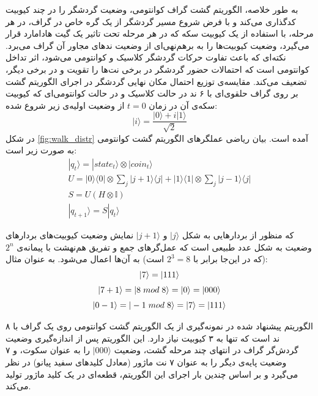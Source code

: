 به طور خلاصه، الگوریتم گشت گراف کوانتومی، وضعیت گردشگر را در چند کیوبیت کدگذاری می‌کند و با فرض شروع مسیر گردشگر از یک گره خاص در گراف، در هر مرحله، با استفاده از یک کیوبیت سکه
که در هر مرحله تحت تاثیر یک گیت هادامارد قرار می‌گیرد، وضعیت کیوبیت‌ها را به برهم‌نهی‌ای از وضعیت ندهای مجاور آن گراف می‌برد. نکته‌ای که باعث تفاوت حرکات گردشگر کلاسیک و کوانتومی می‌شود، اثر تداخل کوانتومی
است که احتمالات حضور گردشگر در برخی نت‌ها را تقویت و در برخی دیگر، تضعیف می‌کند.
مقایسه‌ی توزیع احتمال مکان نهایی گردشگر در اجرای الگوریتم گشت بر روی گراف حلقوی‌ای با ۶ ند در حالت کلاسیک و در حالت کوانتومی‌ای که کیوبیت سکه‌ی آن در زمان
$t=0$
از وضعیت اولیه‌ی زیر شروع شده:
\begin{equation}
    |i\rangle = \frac{|0\rangle + i|1\rangle}{\sqrt{2}}
\end{equation}
در شکل
\ref{fig:walk_distr}
آمده است.
بیان ریاضی عملگرهای الگوریتم گشت کوانتومی به صورت زیر است:
\begin{equation}
\begin{gathered}
    |q_t\rangle = |state_t\rangle \otimes |coin_t\rangle \\[3pt]
    U = |0\rangle \langle 0| \otimes \sum_j |j + 1\rangle \langle j| + |1\rangle \langle 1| \otimes \sum_j |j - 1\rangle
    \langle j| \\[3pt]
    S = U(H \otimes \mathbb{I}) \\[3pt]
    |q_{t+1}\rangle = S|q_t \rangle
\end{gathered}
\end{equation}

که منظور از بردارهایی به شکل
$|j\rangle$
و 
$|j+1\rangle$
نمایش وضعیت کیوبیت‌های بردارهای وضعیت به شکل عدد طبیعی است که عمل‌گرهای جمع و تفریق هم‌نهشت
با پیمانه‌ی
$2^n$
(که در این‌جا برابر با 
$2^3 = 8$
است)
به آن‌ها اعمال می‌شود. به عنوان مثال:
\begin{equation}
    \begin{gathered}
        |7\rangle = |111\rangle \\[3pt]
        |7 + 1\rangle = |8 \hspace{1mm} mod \hspace{1mm} 8\rangle = |0\rangle = |000\rangle \\[3pt]
        |0 - 1\rangle = |-1 \hspace{1mm} mod \hspace{1mm} 8\rangle = |7\rangle = |111\rangle
    \end{gathered}
\end{equation}

الگوریتم پیشنهاد شده در 
\cite{miranda}
نمونه‌گیری از یک الگوریتم گشت کوانتومی روی یک گراف با ۸ ند است که تنها به ۳ کیوبیت نیاز دارد. این الگوریتم پس از اندازه‌گیری وضعیت گردش‌گر گراف در انتهای چند مرحله گشت، وضعیت
$|000\rangle$
را به عنوان سکوت، و ۷ وضعیت پایه‌ی دیگر را به عنوان ۷ نت ماژور (معادل کلیدهای سفید پیانو) در نظر می‌گیرد و بر اساس چندین بار اجرای این الگوریتم، قطعه‌ای در یک کلید ماژور تولید می‌کند.